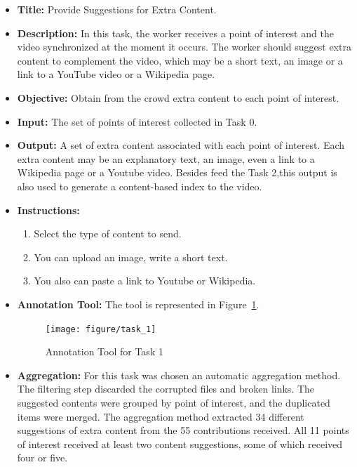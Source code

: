 \begin{itemize}

\item \textbf{Title:} Provide Suggestions for Extra Content.

\item \textbf{Description:} In this task, the worker receives a point of interest and the video synchronized at the moment it occurs. The worker should suggest extra content to complement the video, which may be a short text, an image or a link to a YouTube video or a Wikipedia page.

\item \textbf{Objective:} Obtain from the crowd extra content to each point of interest.


\item \textbf{Input:} The set of points of interest collected in Task 0.


\item \textbf{Output:} A set of extra content associated with each point of interest. Each extra content may be an explanatory text, an image, even a link to a Wikipedia page or a Youtube video. Besides feed the Task 2,this output is also used to generate a content-based index to the video.


\item \textbf{Instructions:} \begin{enumerate}
	\item Select the type of content to send.
	\item You can upload an image, write a short text.
	\item You also can paste a link to Youtube or Wikipedia.
\end{enumerate}

\item \textbf{Annotation Tool:} The tool is represented in Figure~\ref{task_1}.
\begin{figure}[h!]
	\centerline{\texttt{[image: figure/task\_1]}}
	\caption{Annotation Tool for Task 1}
	\label{task_1}
\end{figure}

\item \textbf{Aggregation:} For this task was chosen an automatic aggregation method. The filtering step discarded the corrupted files and broken links. The suggested contents were grouped by point of interest, and the duplicated items were merged. The aggregation method extracted 34 different suggestions of extra content from the 55 contributions received. All 11 points of interest received at least two content suggestions, some of which received four or five. 

\end{itemize}



